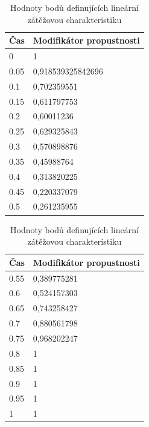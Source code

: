 \documentclass[czech,DP]{thesiskiv}
\begin{document}
\begin{table}[]
\small
\centering
\caption{Hodnoty bodů definujících lineární zátěžovou charakteristiku}
\label{table:test_body_charakteristiky}
\begin{tabular}{|l|l|}
\hline
\textbf{Čas} & \textbf{Modifikátor propustnosti} \\ \hline
0            & 1                                 \\ \hline
0.05         & 0,918539325842696                 \\ \hline
0.1          & 0,702359551                       \\ \hline
0.15         & 0,611797753                       \\ \hline
0.2          & 0,60011236                        \\ \hline
0.25         & 0,629325843                       \\ \hline
0.3          & 0,570898876                       \\ \hline
0.35         & 0,45988764                        \\ \hline
0.4          & 0,313820225                       \\ \hline
0.45         & 0,220337079                       \\ \hline
0.5          & 0,261235955                       \\ \hline
\end{tabular}
\begin{tabular}{|l|l|}
\hline
\textbf{Čas} & \textbf{Modifikátor propustnosti} \\ \hline
0.55         & 0,389775281                       \\ \hline
0.6          & 0,524157303                       \\ \hline
0.65         & 0,743258427                       \\ \hline
0.7          & 0,880561798                       \\ \hline
0.75         & 0,968202247                       \\ \hline
0.8          & 1                                 \\ \hline
0.85         & 1                                 \\ \hline
0.9          & 1                                 \\ \hline
0.95         & 1                                 \\ \hline
1            & 1                                 \\ \hline
\end{tabular}
\end{table}
\end{document}
